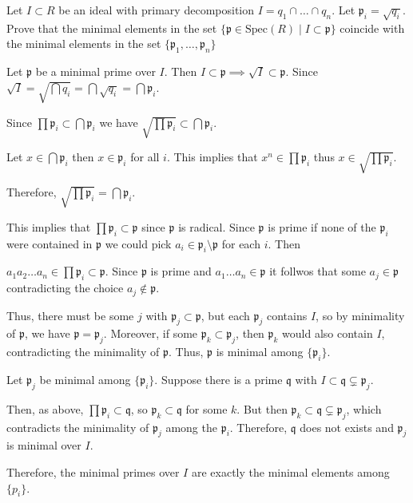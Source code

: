 \documentclass[12pt, letterpaper]{article}
\newcommand{\p}{\mathfrak{p}}
\newcommand{\Spec}{\mathrm{Spec}}
\newcommand{\mf}[1]{\mathfrak{#1}}
\begin{document}
\begin{problem}{}
    Let $I \subset R$ be an ideal with primary decomposition $I = q_1 \cap \dots \cap q_n$. Let $\p_i = \sqrt{q_i}$.
    Prove that the minimal elements in the set $\{\p \in \Spec(R) \mid I \subset \p\}$ coincide with the minimal elements in the set $\{\p_1,\dots,\p_n\}$
\end{problem}
\begin{problemproof}
    Let $\p$ be a minimal prime over $I$. Then $I \subset \p \implies \sqrt{I} \subset \p$. Since $\sqrt{I} = \sqrt{\bigcap q_i} = \bigcap \sqrt{q_i} = \bigcap \p_i$.

    Since  $\prod \p_i \subset \bigcap \p_i$ we have $\sqrt{\prod \p_i} \subset \bigcap \p_i$.

    Let $x \in \bigcap \p_i$ then $x \in \p_i$ for all $i$. This implies that $x^n \in \prod \p_i$ thus $x \in \sqrt{\prod \p_i}$.

    Therefore, $\sqrt{\prod \p_i} = \bigcap \p_i$.

    This implies that $\prod \p_i \subset \p$ since $\p$ is radical. Since $\p$ is prime if none of the $\p_i$ were contained in $\p$ we could pick $a_i \in \p_i \setminus \p$ for each $i$. Then

    $a_1a_2\dots a_n \in \prod \p_i \subset \p$. Since $\p$ is prime and $a_1\dots a_n \in \p$ it follwos that some $a_j \in \p$ contradicting the choice $a_j \notin \p$.

    Thus, there must be some $j$ with $\p_j \subset \p$, but each $\p_j$ contains $I$, so by minimality of $\p$, we have $\p = \p_j$. Moreover, if 
    some $\p_k \subset \p_j$, then $\p_k$ would also contain $I$, contradicting the minimality of $\p$. Thus, $\p$ is minimal among $\{\p_i\}$.

    Let $\p_j$ be minimal among $\{\p_i\}$. Suppose there is a prime $\mf{q}$ with $I \subset \mf{q} \subsetneq \p_j$.

    Then, as above, $\prod \p_i \subset \mf{q}$, so $\p_k \subset \mf{q}$ for some $k$. But then
    $\p_k \subset \mf{q} \subsetneq \p_j$, which contradicts the minimality of $\p_j$ among the $\p_i$. Therefore, $\mf{q}$ does not exists and $\p_j$ is minimal over $I$.

    Therefore, the minimal primes over $I$ are exactly the minimal elements among $\{p_i\}$.
\end{problemproof}
\end{document}
